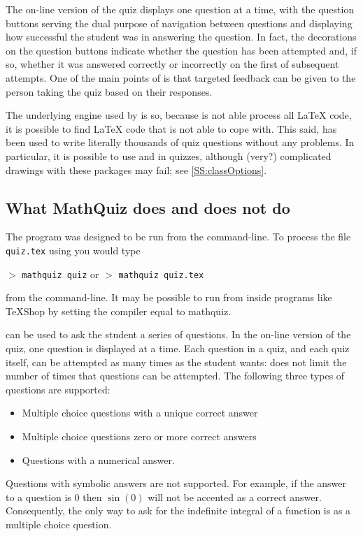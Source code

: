 \documentclass[svgnames]{article}
\begin{document}

    The on-line version of the quiz displays one question at a time,
    with the question buttons serving the dual purpose of navigation
    between questions and displaying how successful the student was
    in answering the question. In fact, the decorations on the question
    buttons indicate whether the question has been attempted and, if so,
    whether it was answered correctly or incorrectly on the first of
    subsequent attempts. One of the main points of \MathQuiz is that
    targeted feedback can be given to the person taking the quiz based
    on their responses.

    The underlying engine used by \MathQuiz is  so, because
     is not able process all \LaTeX{} code, it is possible to
    find \LaTeX{} code that \MathQuiz is not able to cope with.
    This said, \MathQuiz has been used to write literally thousands of quiz
    questions without any problems. In particular, it is possible to use
     and  in \MathQuiz quizzes, although
    (very?) complicated drawings with these packages may fail; see
    \autoref{SS:classOptions}.

\subsection{What MathQuiz does and does not do}

    The \MathQuiz program was designed to be run from the command-line.
    To process the file \texttt{quiz.tex} using \MathQuiz you would
    type

    $>$ \Verb|mathquiz quiz| \qquad or \qquad $>$ \Verb|mathquiz quiz.tex|

    \noindent from the command-line. It may be possible to run \MathQuiz
    from inside programs like \TeX Shop by setting the compiler equal to
    \textsf{mathquiz}.

    \MathQuiz can be used to ask the student a series of questions. In
    the on-line version of the quiz, one question is displayed at a
    time. Each question in a quiz, and each quiz itself, can be
    attempted as many times as the student wants: \MathQuiz does not
    limit the number of times that questions can be attempted.
    The following three types of questions are supported:
    \begin{itemize}
      \item Multiple choice questions with a unique correct answer
      \item Multiple choice questions zero or more correct answers
      \item Questions with a numerical answer.
    \end{itemize}
    Questions with symbolic answers are not supported.
    For example, if the answer to a question is $0$ then $\sin(0)$ will
    not be accented as a correct answer. Consequently, the only way to ask for the
    indefinite integral of a function is as a multiple choice question.
\end{document}
